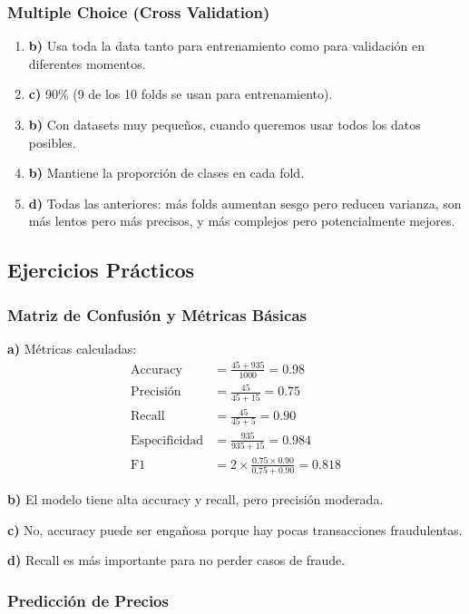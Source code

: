 \documentclass[12pt]{article}
\begin{document}
\subsubsection{Multiple Choice (Cross Validation)}

\begin{enumerate}
    \item \textbf{b)} Usa toda la data tanto para entrenamiento como para validación en diferentes momentos.
    \item \textbf{c)} 90\% (9 de los 10 folds se usan para entrenamiento).
    \item \textbf{b)} Con datasets muy pequeños, cuando queremos usar todos los datos posibles.
    \item \textbf{b)} Mantiene la proporción de clases en cada fold.
    \item \textbf{d)} Todas las anteriores: más folds aumentan sesgo pero reducen varianza, son más lentos pero más precisos, y más complejos pero potencialmente mejores.
\end{enumerate}

\subsection{Ejercicios Prácticos}

\subsubsection{Matriz de Confusión y Métricas Básicas}

\textbf{a)} Métricas calculadas:
\begin{align*}
\text{Accuracy} &= \frac{45 + 935}{1000} = 0.98 \\
\text{Precisión} &= \frac{45}{45 + 15} = 0.75 \\
\text{Recall} &= \frac{45}{45 + 5} = 0.90 \\
\text{Especificidad} &= \frac{935}{935 + 15} = 0.984 \\
\text{F1} &= 2 \times \frac{0.75 \times 0.90}{0.75 + 0.90} = 0.818
\end{align*}

\textbf{b)} El modelo tiene alta accuracy y recall, pero precisión moderada.

\textbf{c)} No, accuracy puede ser engañosa porque hay pocas transacciones fraudulentas.

\textbf{d)} Recall es más importante para no perder casos de fraude.

\subsubsection{Predicción de Precios}
\end{document}
